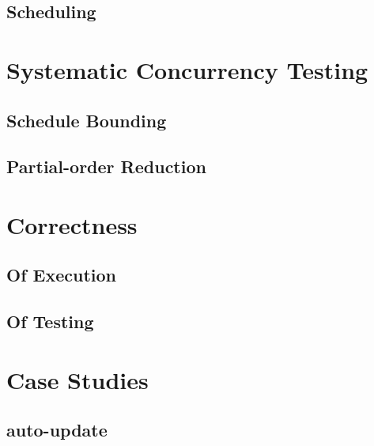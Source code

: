 \documentclass[openright, dottedtoc, headinclude, footinclude=true, a4paper, numbers=noenddot]{scrreprt}
\begin{document}
  \section{Scheduling}
  \label{sec:execution-scheduling}
  

\null\clearpage
\chapter{Systematic Concurrency Testing}
\label{chap:sct}


  \section{Schedule Bounding}
  \label{sec:sct-bounding}
  

  \section{Partial-order Reduction}
  \label{sec:sct-por}
  

\null\clearpage
\chapter{Correctness}
\label{chap:correctness}


  \section{Of Execution}
  \label{sec:correctness-execution}
  

  \section{Of Testing}
  \label{sec:correctness-testing}
  

\null\clearpage
\chapter{Case Studies}
\label{chap:casestudies}


  \section{auto-update}
  \label{sec:casestudies-autoupdate}
  
\end{document}
